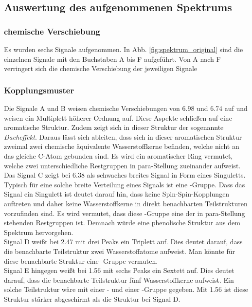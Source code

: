 \subsection{Auswertung des aufgenommenen Spektrums}
\subsubsection*{chemische Verschiebung}
Es wurden sechs Signale aufgenommen. In Abb. \ref{fig:spektrum_original} sind die einzelnen Signale mit den Buchstaben A bis F aufgeführt. 
Von A nach F verringert sich die chemische Verschiebung der jeweiligen Signale

\subsubsection*{Kopplungsmuster}
Die Signale A und B weisen chemische Verschiebungen von \SI{6,98}{\ppm} und \SI{6,74}{\ppm} auf und weisen ein Multiplett höherer Ordnung auf. Diese Aspekte schließen auf eine aromatische Struktur. Zudem zeigt sich in dieser Struktur der sogenannte \textit{Dacheffekt}. Daraus lässt sich ableiten, dass sich in dieser aromatischen Struktur zweimal zwei chemische äquivalente Wasserstoffkerne befinden, welche nicht an das gleiche C-Atom gebunden sind. Es wird ein aromatischer Ring vermutet, welche zwei unterschiedliche Restgruppen in para-Stellung zueinander aufweist.\\
Das Signal C zeigt bei \SI{6,38}{\ppm} als schwaches breites Signal in Form eines Singuletts. Typisch für eine solche breite Verteilung eines Signals ist eine -Gruppe. Dass das Signal ein Singulett ist deutet darauf hin, dass keine Spin-Spin-Kopplungen auftreten und daher keine Wasserstoffkerne in direkt benachbarten Teilstrukturen vorzufinden sind. Es wird vermutet, dass diese -Gruppe eine der in para-Stellung stehenden Restgruppen ist. Demnach würde eine phenolische Struktur aus dem Spektrum hervorgehen.\\
Signal D weißt bei \SI{2,47}{\ppm} mit drei Peaks ein Triplett auf. Dies deutet darauf, dass die benachbarte Teilstruktur zwei Wasserstoffatome aufweist. Man könnte für diese benachbarte Struktur eine -Gruppe vermuten.\\
Signal E hingegen weißt bei \SI{1,56}{\ppm} mit sechs Peaks ein Sextett auf. Dies deutet darauf, dass die benachbarte Teilstruktur fünf Wasserstoffkerne aufweist. Ein solche Teilstruktur wäre mit einer - und einer -Gruppe gegeben. Mit \SI{1,56}{\ppm} ist diese Struktur stärker abgeschirmt als die Struktur bei Signal D. \\
